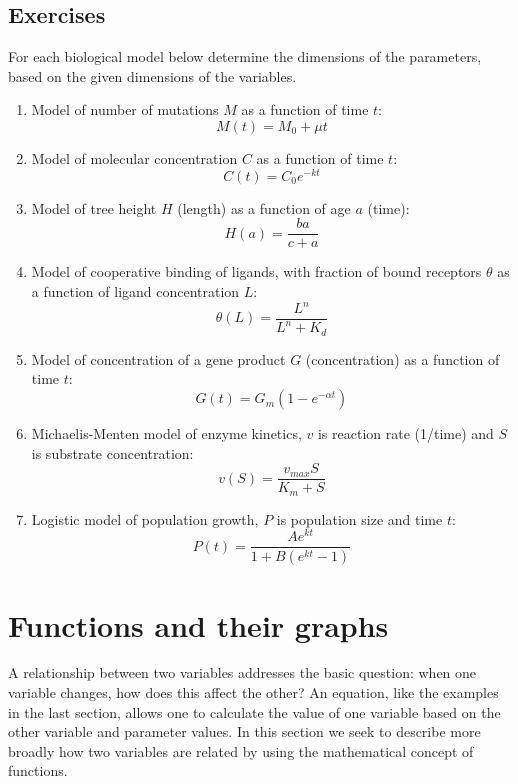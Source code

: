 \documentclass[
  letterpaper,
  DIV=11,
  numbers=noendperiod]{scrreprt}
\begin{document}
\hypertarget{exercises-2}{%
\subsection{Exercises}\label{exercises-2}}

For each biological model below determine the dimensions of the
parameters, based on the given dimensions of the variables.

\begin{enumerate}
\def\labelenumi{\arabic{enumi}.}
\item
  Model of number of mutations \(M\) as a function of time \(t\):
  \[ M(t) = M_0 + \mu t\]
\item
  Model of molecular concentration \(C\) as a function of time \(t\):
  \[ C(t) = C_0 e^{-kt} \]
\item
  Model of tree height \(H\) (length) as a function of age \(a\) (time):
  \[ H(a) = \frac{b a}{c + a}\]
\item
  Model of cooperative binding of ligands, with fraction of bound
  receptors \(\theta\) as a function of ligand concentration \(L\):
  \[ \theta (L) = \frac{L^n}{L^n + K_d}\]
\item
  Model of concentration of a gene product \(G\) (concentration) as a
  function of time \(t\): \[ G(t) = G_m (1 - e^{-\alpha t})\]
\item
  Michaelis-Menten model of enzyme kinetics, \(v\) is reaction rate
  (1/time) and \(S\) is substrate concentration:
  \[ v(S) = \frac{v_{max} S}{K_m + S}\]
\item
  Logistic model of population growth, \(P\) is population size and time
  \(t\): \[ P(t) = \frac{A e^{kt}}{1 + B(e^{kt} -1)} \]
\end{enumerate}

\hypertarget{sec:math2}{%
\section{Functions and their graphs}\label{sec:math2}}

A relationship between two variables addresses the basic question: when
one variable changes, how does this affect the other? An equation, like
the examples in the last section, allows one to calculate the value of
one variable based on the other variable and parameter values. In this
section we seek to describe more broadly how two variables are related
by using the mathematical concept of functions.
\end{document}
